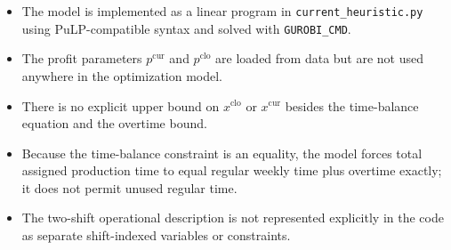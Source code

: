 \begin{itemize}
    \item The model is implemented as a linear program in \texttt{current\_heuristic.py} using PuLP-compatible syntax and solved with \texttt{GUROBI\_CMD}.
    \item The profit parameters $p^{\mathrm{cur}}$ and $p^{\mathrm{clo}}$ are loaded from data but are not used anywhere in the optimization model.
    \item There is no explicit upper bound on $x^{\mathrm{clo}}$ or $x^{\mathrm{cur}}$ besides the time-balance equation and the overtime bound.
    \item Because the time-balance constraint is an equality, the model forces total assigned production time to equal regular weekly time plus overtime exactly; it does not permit unused regular time.
    \item The two-shift operational description is not represented explicitly in the code as separate shift-indexed variables or constraints.
\end{itemize}
